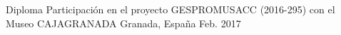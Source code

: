 



\begin{cvhonors}

  \cvhonor
    {Diploma} %
    {Participación en el proyecto GESPROMUSACC (2016-295) con el Museo CAJAGRANADA} %
    {Granada, España} %
    {Feb. 2017} %

\end{cvhonors}
